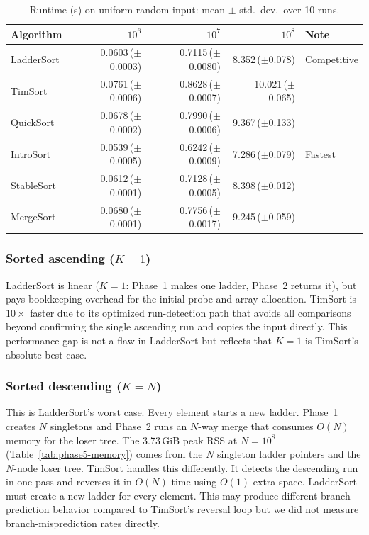 \documentclass{ieeeaccess}
\theoremstyle{plain}
\theoremstyle{definition}
\begin{document}
\begin{table}[t]
\centering\small
\caption{Runtime (s) on uniform random input: mean $\pm$ std.\ dev.\ over 10 runs.}
\label{tab:random-runtime}
\begin{tabularx}{\linewidth}{@{}lrrrX@{}}
\toprule
Algorithm & $10^6$ & $10^7$ & $10^8$ & Note \\
\midrule
LadderSort     & 0.0603\,($\pm$0.0003) & 0.7115\,($\pm$0.0080) & 8.352\,($\pm$0.078) & Competitive \\
TimSort        & 0.0761\,($\pm$0.0006) & 0.8628\,($\pm$0.0007) & 10.021\,($\pm$0.065) & \\
QuickSort      & 0.0678\,($\pm$0.0002) & 0.7990\,($\pm$0.0006) & 9.367\,($\pm$0.133) & \\
IntroSort      & 0.0539\,($\pm$0.0005) & 0.6242\,($\pm$0.0009) & 7.286\,($\pm$0.079) & Fastest \\
StableSort     & 0.0612\,($\pm$0.0001) & 0.7128\,($\pm$0.0005) & 8.398\,($\pm$0.012) & \\
MergeSort      & 0.0680\,($\pm$0.0001) & 0.7756\,($\pm$0.0017) & 9.245\,($\pm$0.059) & \\
\bottomrule
\end{tabularx}
\end{table}

\subsubsection{Sorted ascending ($K=1$)}
LadderSort is linear ($K=1$: Phase~1 makes one ladder, Phase~2 returns it),
but pays bookkeeping overhead for the initial probe and array allocation.
TimSort is $10\times$ faster due to its optimized run-detection path that
avoids all comparisons beyond confirming the single ascending run and copies
the input directly.  This performance gap is not a flaw in LadderSort but
reflects that $K=1$ is TimSort's absolute best case.


\subsubsection{Sorted descending ($K=N$)}
This is LadderSort's worst case. Every element starts a new ladder. Phase~1 creates $N$ singletons and Phase~2 runs an $N$-way merge that consumes $O(N)$ memory for the loser tree. The 3.73\,GiB peak RSS at $N=10^8$ (Table~\ref{tab:phase5-memory}) comes from the $N$ singleton ladder pointers and the $N$-node loser tree. TimSort handles this differently. It detects the descending run in one pass and reverses it in $O(N)$ time using $O(1)$ extra space. LadderSort must create a new ladder for every element. This may produce different branch-prediction behavior compared to TimSort's reversal loop but we did not measure branch-misprediction rates directly.
\end{document}
